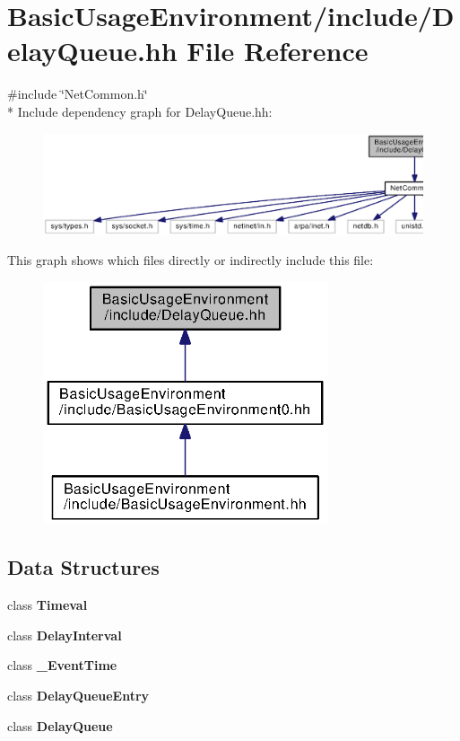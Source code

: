 \section{Basic\+Usage\+Environment/include/\+Delay\+Queue.hh File Reference}
\label{DelayQueue_8hh}
{\ttfamily \#include \char`\"{}Net\+Common.\+h\char`\"{}}\\*
Include dependency graph for Delay\+Queue.\+hh\+:
\nopagebreak
\begin{figure}[H]
\begin{center}
\leavevmode
\includegraphics[width=350pt]{DelayQueue_8hh__incl}
\end{center}
\end{figure}
This graph shows which files directly or indirectly include this file\+:
\nopagebreak
\begin{figure}[H]
\begin{center}
\leavevmode
\includegraphics[width=238pt]{DelayQueue_8hh__dep__incl}
\end{center}
\end{figure}
\subsection*{Data Structures}
\begin{DoxyCompactItemize}
\item 
class {\bf Timeval}
\item 
class {\bf Delay\+Interval}
\item 
class {\bf \+\_\+\+Event\+Time}
\item 
class {\bf Delay\+Queue\+Entry}
\item 
class {\bf Delay\+Queue}
\end{DoxyCompactItemize}
